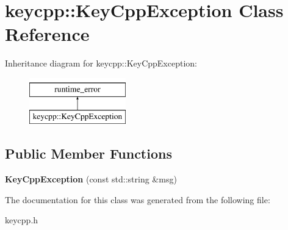 \hypertarget{classkeycpp_1_1_key_cpp_exception}{\section{keycpp\-:\-:Key\-Cpp\-Exception Class Reference}
\label{classkeycpp_1_1_key_cpp_exception}
}
Inheritance diagram for keycpp\-:\-:Key\-Cpp\-Exception\-:\begin{figure}[H]
\begin{center}
\leavevmode
\includegraphics[height=2.000000cm]{classkeycpp_1_1_key_cpp_exception}
\end{center}
\end{figure}
\subsection*{Public Member Functions}
\begin{DoxyCompactItemize}
\item 
\hypertarget{classkeycpp_1_1_key_cpp_exception_af12dadc3f596f1e82cd65d55c2f64c65}{{\bfseries Key\-Cpp\-Exception} (const std\-::string \&msg)}\label{classkeycpp_1_1_key_cpp_exception_af12dadc3f596f1e82cd65d55c2f64c65}

\end{DoxyCompactItemize}


The documentation for this class was generated from the following file\-:\begin{DoxyCompactItemize}
\item 
keycpp.\-h\end{DoxyCompactItemize}
